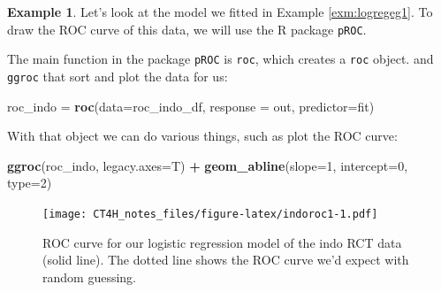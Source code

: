 \documentclass[
  openany]{book}
\newenvironment{Shaded}{\begin{snugshade}}{\end{snugshade}}
\newcommand{\AttributeTok}[1]{\textcolor[rgb]{0.13,0.29,0.53}{#1}}
\newcommand{\CommentTok}[1]{\textcolor[rgb]{0.56,0.35,0.01}{\textit{#1}}}
\newcommand{\DecValTok}[1]{\textcolor[rgb]{0.00,0.00,0.81}{#1}}
\newcommand{\FunctionTok}[1]{\textcolor[rgb]{0.13,0.29,0.53}{\textbf{#1}}}
\newcommand{\NormalTok}[1]{#1}
\newcommand{\OtherTok}[1]{\textcolor[rgb]{0.56,0.35,0.01}{#1}}
\newcommand{\SpecialCharTok}[1]{\textcolor[rgb]{0.81,0.36,0.00}{\textbf{#1}}}
\theoremstyle{definition}
\theoremstyle{definition}
\newtheorem{example}{Example}[chapter]
\theoremstyle{definition}
\theoremstyle{definition}
\theoremstyle{remark}
\begin{document}
\begin{example}
Let's look at the model we fitted in Example \ref{exm:logregeg1}. To draw the ROC curve of this data, we will use the R package \texttt{pROC}.

\begin{Shaded}
\end{Shaded}

The main function in the package \texttt{pROC} is \texttt{roc}, which creates a \texttt{roc} object. and \texttt{ggroc} that sort and plot the data for us:

\begin{Shaded}
\begin{Highlighting}[]
\NormalTok{roc\_indo }\OtherTok{=} \FunctionTok{roc}\NormalTok{(}\AttributeTok{data=}\NormalTok{roc\_indo\_df, }\AttributeTok{response =}\NormalTok{ out, }\AttributeTok{predictor=}\NormalTok{fit)}
\end{Highlighting}
\end{Shaded}

With that object we can do various things, such as plot the ROC curve:

\begin{Shaded}
\begin{Highlighting}[]
\FunctionTok{ggroc}\NormalTok{(roc\_indo, }\AttributeTok{legacy.axes=}\NormalTok{T) }\SpecialCharTok{+} \FunctionTok{geom\_abline}\NormalTok{(}\AttributeTok{slope=}\DecValTok{1}\NormalTok{, }\AttributeTok{intercept=}\DecValTok{0}\NormalTok{, }\AttributeTok{type=}\DecValTok{2}\NormalTok{)}
\end{Highlighting}
\end{Shaded}

\begin{figure}
\centering
\texttt{[image: CT4H\_notes\_files/figure-latex/indoroc1-1.pdf]}
\caption{\label{fig:indoroc1}ROC curve for our logistic regression model of the indo RCT data (solid line). The dotted line shows the ROC curve we'd expect with random guessing.}
\end{figure}


\end{example}
\end{document}
